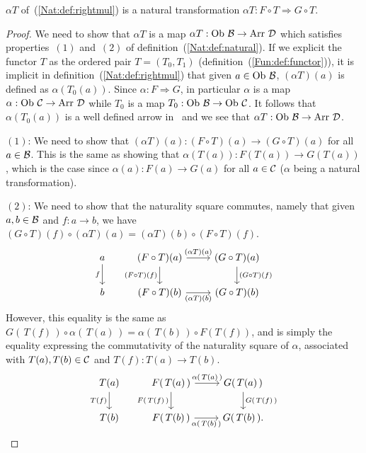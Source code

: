 \begin{prop}\label{Nat:prop:rightmul}
    $\alpha T$ of~(\ref{Nat:def:rightmul}) is a natural transformation 
    $\alpha T:F\circ T\Rightarrow G\circ T$.
\end{prop}
\begin{proof}
    We need to show that $\alpha T$ is a map $\alpha T : \ob\ \Bat\to\arr\ \Dat$
    which satisfies properties~$(1)$ and~$(2)$ of 
    definition~(\ref{Nat:def:natural}). If we explicit the functor $T$ as the 
    ordered pair $T=(T_{0},T_{1})$ (definition~(\ref{Fun:def:functor})), it is
    implicit in definition~(\ref{Nat:def:rightmul}) that given $a\in\mbox{\rm Ob}\ \mbox{$\cal B$}$,
    $(\alpha T)(a)$ is defined as $\alpha (T_{0}(a))$. Since 
    $\alpha:F\Rightarrow G$, in particular $\alpha$ is a map $\alpha:\mbox{\rm Ob}\ \mbox{$\cal C$}
    \to\mbox{\rm Arr}\ \mbox{$\cal D$}$ while $T_{0}$ is a map $T_{0}:\mbox{\rm Ob}\ \mbox{$\cal B$}\to\mbox{\rm Ob}\ \mbox{$\cal C$}$. It 
    follows that $\alpha (T_{0}(a))$ is a well defined arrow in \Dat\ and we
    see that $\alpha T:\ob\ \Bat\to\arr\ \Dat$.

    $(1)$: We need to show that $(\alpha T)(a): (F\circ T)(a) \to (G\circ T)(a)$
    for all $a\in\mbox{$\cal B$}$. This is the same as showing that $\alpha (T(a)) :
    F(T(a))\to G(T(a))$, which is the case since $\alpha(a):F(a)\to G(a)$ for
    all $a\in\mbox{$\cal C$}$ ($\alpha$ being a natural transformation).

    $(2)$: We need to show that the naturality square commutes, namely that
    given $a,b\in\mbox{$\cal B$}$ and $f:a\to b$, we have $(G\circ T)(f)\circ(\alpha T)(a)
    =(\alpha T)(b)\circ(F\circ T)(f)$.
    \[
        \begin{tikzcd}
            a\arrow[d,swap, "f"]
            &(F\circ T)(a)\arrow[r, "(\alpha T)(a)"]\arrow[d, swap,"(F\circ T)(f)"]
            &(G\circ T)(a)\arrow[d, "(G\circ T)(f)"]
            \\
            b
            &(F\circ T)(b)\arrow[r, swap, "(\alpha T)(b)"]
            &(G\circ T)(b)
        \end{tikzcd}
    \]
    However, this equality is the same as $G(\,T(f)\,)\circ\alpha(\,T(a)\,)
    =\alpha(\,T(b)\,)\circ F(T(f))$, and is simply the equality expressing
    the commutativity of the naturality square of $\alpha$, associated with 
    $T(a),T(b)\in\mbox{$\cal C$}$ and $T(f):T(a)\to T(b)$.
    \[
        \begin{tikzcd}
            T(a)\arrow[d,swap, "T(f)"]
            &F(\,T(a)\,)\arrow[r, "\alpha(\,T(a)\,)"]\arrow[d, swap,"F(\,T(f)\,)"]
            &G(\,T(a)\,)\arrow[d, "G(\,T(f)\,)"]
            \\
            T(b)
            &F(\,T(b)\,)\arrow[r, swap, "\alpha(\,T(b)\,)"]
            &G(\,T(b)\,).
        \end{tikzcd}
    \]
 
\end{proof}
